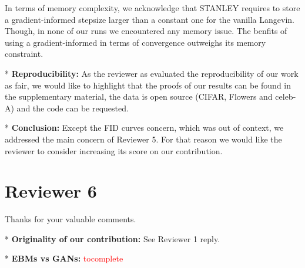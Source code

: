 \documentclass[letterpaper]{article} %
\begin{document}
In terms of memory complexity, we acknowledge that STANLEY requires to store a gradient-informed stepsize larger than a constant one for the vanilla Langevin. Though, in none of our runs we encountered any memory issue. The benfits of using a gradient-informed in terms of convergence outweighs its memory constraint.

* \textbf{Reproducibility:} As the reviewer as evaluated the reproducibility of our work as fair, we would like to highlight that the proofs of our results can be found in the supplementary material, the data is open source (CIFAR, Flowers and celeb-A) and the code can be requested.

* \textbf{Conclusion:} Except the FID curves concern, which was out of context, we addressed the main concern of Reviewer 5. For that reason we would like the reviewer to consider increasing its score on our contribution.


\section{Reviewer 6}

Thanks for your valuable comments.

* \textbf{Originality of our contribution:} 
See Reviewer 1 reply.

* \textbf{EBMs vs GANs:} \textcolor{red}{tocomplete}
\end{document}
